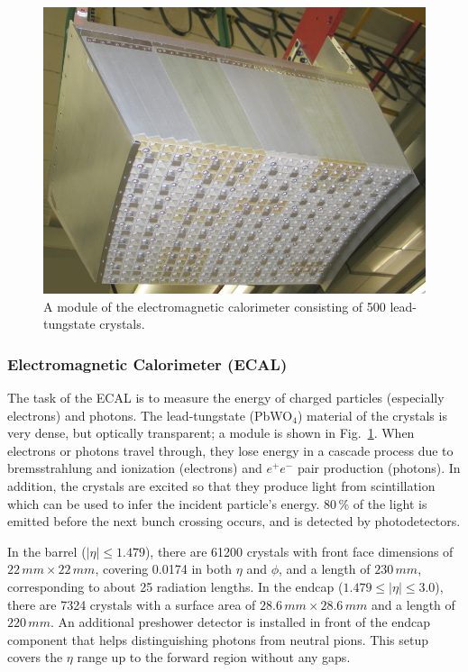 \begin{figure}
	\includegraphics[width=.7\textwidth]{Detector/ECAL_crystal}
	\centering
	\caption{A module of the electromagnetic calorimeter consisting of 500 lead-tungstate crystals.}
	\label{fig:ECAL}
\end{figure}

\subsubsection*{Electromagnetic Calorimeter (ECAL)}
The task of the ECAL is to measure the energy of charged particles (especially electrons) and photons. The lead-tungstate (PbWO$_4$) material of the crystals is very dense, but optically transparent; a module is shown in Fig.~\ref{fig:ECAL}. When electrons or photons travel through, they lose energy in a cascade process due to bremsstrahlung and ionization (electrons) and $e^+ e^-$ pair production (photons). In addition, the crystals are excited so that they produce light from scintillation which can be used to infer the incident particle's energy. 80\,\% of the light is emitted before the next bunch crossing occurs, and is detected by photodetectors.

In the barrel ($|\eta| \leq 1.479$), there are 61200 crystals with front face dimensions of $22\,\unit{mm} \times 22\,\unit{mm}$, covering 0.0174 in both $\eta$ and $\phi$, and a length of $230\,\unit{mm}$, corresponding to about 25 radiation lengths. In the endcap ($1.479 \leq |\eta| \leq 3.0$), there are 7324 crystals with a surface area of $28.6\,\unit{mm} \times 28.6\,\unit{mm}$ and a length of $220\,\unit{mm}$. An additional preshower detector is installed in front of the endcap component that helps distinguishing photons from neutral pions. This setup covers the $\eta$ range up to the forward region without any gaps.


